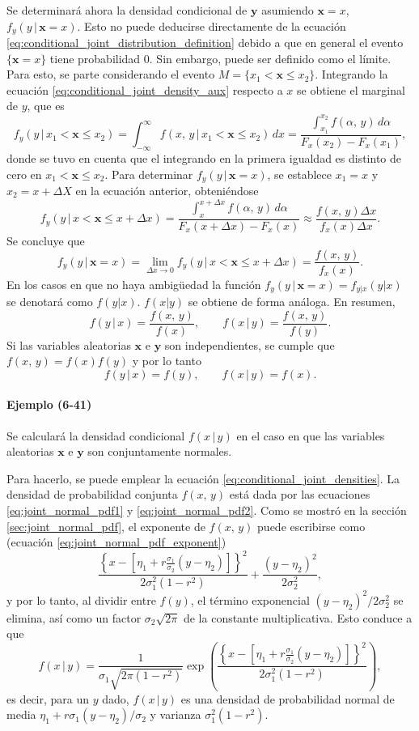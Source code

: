 \documentclass[a4paper]{report}
\newcommand{\x}{\mathbf{x}}
\newcommand{\y}{\mathbf{y}}
\begin{document}
Se determinará ahora la densidad condicional de \(\y\) asumiendo \(\x=x\), \(f_y(y\,|\,\x=x)\). Esto no puede deducirse directamente de la ecuación \ref{eq:conditional_joint_distribution_definition} debido a que en general el evento \(\{\x=x\}\) tiene probabilidad 0. Sin embargo, puede ser definido como el límite. Para esto, se parte considerando el evento \(M=\{x_1<\x\leq x_2\}\). Integrando la ecuación \ref{eq:conditional_joint_density_aux} respecto a \(x\) se obtiene el marginal de \(y\), que es
\[
 f_y(y\,|\,x_1<\x\leq x_2)=\int_{-\infty}^{\infty}f(x,\,y\,|\,x_1<\x\leq x_2)\,dx=\frac{\int_{x_1}^{x_2}f(\alpha,\,y)\,d\alpha}{F_x(x_2)-F_x(x_1)},
\]
donde se tuvo en cuenta que el integrando en la primera igualdad es distinto de cero en \(x_1<\x\leq x_2\). Para determinar \(f_y(y\,|\,\x=x)\), se establece \(x_1=x\) y \(x_2=x+\Delta X\) en la ecuación anterior, obteniéndose
\[
 f_y(y\,|\,x<\x\leq x+\Delta x)=\frac{\int_{x}^{x+\Delta x}f(\alpha,\,y)\,d\alpha}{F_x(x+\Delta x)-F_x(x)}\approx\frac{f(x,\,y)\Delta x}{f_x(x)\Delta x}.
\]
Se concluye que
\[
 f_y(y\,|\,\x=x)=\lim_{\Delta x\to0}f_y(y\,|\,x<\x\leq x+\Delta x)=\frac{f(x,\,y)}{f_x(x)}.
\]
En los casos en que no haya ambigüedad la función \(f_y(y\,|\,\x=x)=f_{y|x}(y|x)\) se denotará como \(f(y|x)\). \(f(x|y)\) se obtiene de forma análoga. En resumen,
\begin{equation}\label{eq:conditional_joint_densities}
 f(y\,|\,x)=\frac{f(x,\,y)}{f(x)},\qquad f(x\,|\,y)=\frac{f(x,\,y)}{f(y)}.
\end{equation}
Si las variables aleatorias \(\x\) e \(\y\) son independientes, se cumple que \(f(x,\,y)=f(x)f(y)\) y por lo tanto
\[
 f(y\,|\,x)=f(y),\qquad f(x\,|\,y)=f(x).
\]

\paragraph{Ejemplo (6-41)} Se calculará la densidad condicional \(f(x\,|\,y)\) en el caso en que las variables aleatorias \(\x\) e \(\y\) son conjuntamente normales.

Para hacerlo, se puede emplear la ecuación \ref{eq:conditional_joint_densities}. La densidad de probabilidad conjunta \(f(x,\,y)\) está dada por las ecuaciones \ref{eq:joint_normal_pdf1} y \ref{eq:joint_normal_pdf2}. Como se mostró en la sección \ref{sec:joint_normal_pdf}, el exponente de \(f(x,\,y)\) puede escribirse como (ecuación \ref{eq:joint_normal_pdf_exponent})
\[
 \frac{\left\{x-\left[\eta_1+r\frac{\sigma_1}{\sigma_2}(y-\eta_2)\right]\right\}^2}{2\sigma_1^2(1-r^2)}+\frac{(y-\eta_2)^2}{2\sigma_2^2},
\]
y por lo tanto, al dividir entre \(f(y)\), el término exponencial \((y-\eta_2)^2/2\sigma_2^2\) se elimina, así como un factor \(\sigma_2\sqrt{2\pi}\) de la constante multiplicativa. Esto conduce a que
\begin{equation}\label{eq:joint_normal_conditional_pdf}
 f(x\,|\,y)=\frac{1}{\sigma_1\sqrt{2\pi(1-r^2)}}\exp\left(\frac{\left\{x-\left[\eta_1+r\frac{\sigma_1}{\sigma_2}(y-\eta_2)\right]\right\}^2}{2\sigma_1^2(1-r^2)}\right),
\end{equation}
es decir, para un \(y\) dado, \(f(x\,|\,y)\) es una densidad de probabilidad normal de media \(\eta_1+r\sigma_1(y-\eta_2)/\sigma_2\) y varianza \(\sigma_1^2(1-r^2)\).
\end{document}
